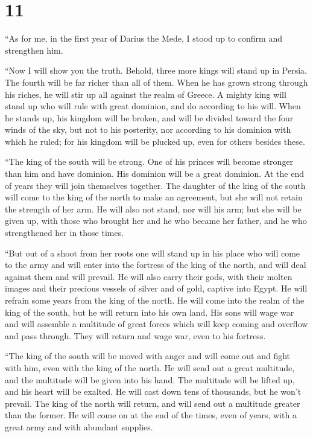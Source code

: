 \hypertarget{section-10}{%
\section{11}\label{section-10}}

 ``As for me, in the first year of Darius the Mede, I
stood up to confirm and strengthen him.

 ``Now I will show you the truth. Behold, three more kings
will stand up in Persia. The fourth will be far richer than all of them.
When he has grown strong through his riches, he will stir up all against
the realm of Greece.  A mighty king will stand up who will
rule with great dominion, and do according to his will. 
When he stands up, his kingdom will be broken, and will be divided
toward the four winds of the sky, but not to his posterity, nor
according to his dominion with which he ruled; for his kingdom will be
plucked up, even for others besides these.

 ``The king of the south will be strong. One of his
princes will become stronger than him and have dominion. His dominion
will be a great dominion.  At the end of years they will
join themselves together. The daughter of the king of the south will
come to the king of the north to make an agreement, but she will not
retain the strength of her arm. He will also not stand, nor will his
arm; but she will be given up, with those who brought her and he who
became her father, and he who strengthened her in those times.

 ``But out of a shoot from her roots one will stand up in
his place who will come to the army and will enter into the fortress of
the king of the north, and will deal against them and will prevail.
 He will also carry their gods, with their molten images
and their precious vessels of silver and of gold, captive into Egypt. He
will refrain some years from the king of the north.  He
will come into the realm of the king of the south, but he will return
into his own land.  His sons will wage war and will
assemble a multitude of great forces which will keep coming and overflow
and pass through. They will return and wage war, even to his fortress.

 ``The king of the south will be moved with anger and
will come out and fight with him, even with the king of the north. He
will send out a great multitude, and the multitude will be given into
his hand.  The multitude will be lifted up, and his heart
will be exalted. He will cast down tens of thousands, but he won't
prevail.  The king of the north will return, and will
send out a multitude greater than the former. He will come on at the end
of the times, even of years, with a great army and with abundant
supplies.

